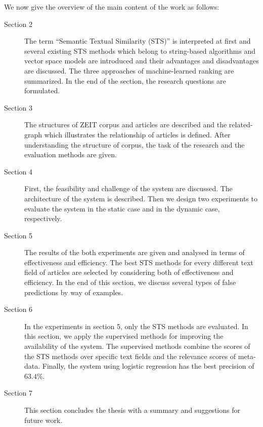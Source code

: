 We now give the overview of the main content of the work as follows:
\begin{description}
    \item[Section 2] The term ``Semantic Textual Similarity (STS)'' is interpreted at first and several existing STS methods which belong to string-based algorithms and vector space models are introduced and their advantages and disadvantages are discussed. The three approaches of machine-learned ranking are summarized. In the end of the section, the research questions are formulated.
    \item[Section 3] The structures of ZEIT corpus and articles are described and the related-graph which illustrates the relationship of articles is defined. After understanding the structure of corpus, the task of the research and the evaluation methods are given. 
    \item[Section 4] First, the feasibility and challenge of the system are discussed. The architecture of the system is described. Then we design two experiments to evaluate the system in the static case and in the dynamic case, respectively. 
    \item[Section 5] The results of the both experiments are given and analysed in terms of effectiveness and efficiency. The best STS methods for every different text field of articles are selected by considering both of effectiveness and efficiency. In the end of this section, we discuss several types of false predictions by way of examples.
    \item[Section 6] In the experiments in section 5, only the STS methods are evaluated. In this section, we apply the supervised methods for improving the availability of the system. The supervised methods combine the scores of the STS methods over specific text fields and the relevance scores of meta-data. Finally, the system using logistic regression has the best precision of $63.4\%$.
    \item[Section 7] This section concludes the thesis with a summary and suggestions for future work.
\end{description}